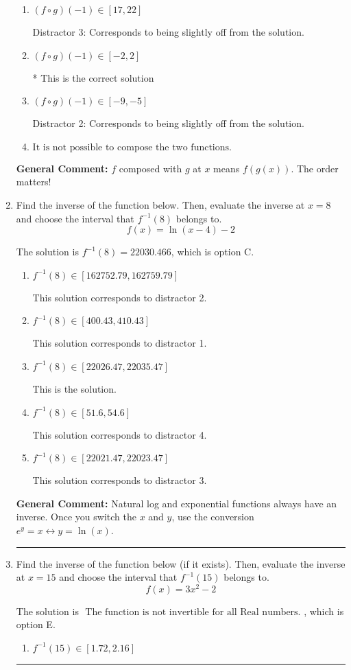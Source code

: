 \documentclass{extbook}[14pt]
\newcommand{\litem}[1]{\item #1

\rule{\textwidth}{0.4pt}}
\begin{document}
\begin{enumerate}
{\begin{enumerate}[label=\Alph*.]
 Distractor 1: Corresponds to reversing the composition.
\item \( (f \circ g)(-1) \in [17, 22] \)

 Distractor 3: Corresponds to being slightly off from the solution.
\item \( (f \circ g)(-1) \in [-2, 2] \)

* This is the correct solution
\item \( (f \circ g)(-1) \in [-9, -5] \)

 Distractor 2: Corresponds to being slightly off from the solution.
\item \( \text{It is not possible to compose the two functions.} \)


\end{enumerate}

\textbf{General Comment:} $f$ composed with $g$ at $x$ means $f(g(x))$. The order matters!
}
\litem{
Find the inverse of the function below. Then, evaluate the inverse at $x = 8$ and choose the interval that $f^{-1}(8)$ belongs to.
\[ f(x) = \ln{(x-4)}-2 \]

The solution is \( f^{-1}(8) = 22030.466 \), which is option C.\begin{enumerate}[label=\Alph*.]
\item \( f^{-1}(8) \in [162752.79, 162759.79] \)

 This solution corresponds to distractor 2.
\item \( f^{-1}(8) \in [400.43, 410.43] \)

 This solution corresponds to distractor 1.
\item \( f^{-1}(8) \in [22026.47, 22035.47] \)

 This is the solution.
\item \( f^{-1}(8) \in [51.6, 54.6] \)

 This solution corresponds to distractor 4.
\item \( f^{-1}(8) \in [22021.47, 22023.47] \)

 This solution corresponds to distractor 3.
\end{enumerate}

\textbf{General Comment:} Natural log and exponential functions always have an inverse. Once you switch the $x$ and $y$, use the conversion $ e^y = x \leftrightarrow y=\ln(x)$.
}
\litem{
Find the inverse of the function below (if it exists). Then, evaluate the inverse at $x = 15$ and choose the interval that $f^{-1}(15)$ belongs to.
\[ f(x) = 3 x^2 - 2 \]

The solution is \( \text{ The function is not invertible for all Real numbers. } \), which is option E.\begin{enumerate}[label=\Alph*.]
\item \( f^{-1}(15) \in [1.72, 2.16] \)


\end{enumerate}}
\end{enumerate}
\end{document}
